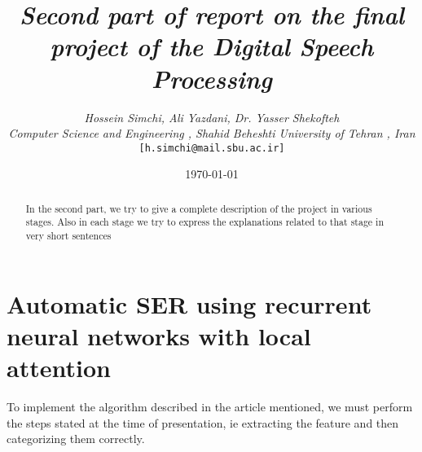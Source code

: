 \documentclass[10pt]{article}
\begin{document}
\title{\emph{\textbf{Second part of report on the final project of the Digital Speech Processing}}}
\author{\emph{Hossein Simchi, Ali Yazdani, Dr. Yasser Shekofteh}\\
\emph{Computer Science and Engineering , Shahid Beheshti University of Tehran , Iran}\\
\texttt{[h.simchi@mail.sbu.ac.ir]}
}
\date{\today}
\maketitle
\begin{abstract}
In the second part, we try to give a complete description of the project in various stages. Also in each stage we try to express the explanations related to that stage in very short sentences
\end{abstract}
\section{\textbf{\large{{Automatic SER using  recurrent neural networks with local attention}}}}
To implement the algorithm described in the article mentioned, we must perform the steps stated at the time of presentation, ie extracting the feature and then categorizing them correctly.\\
\end{document}
